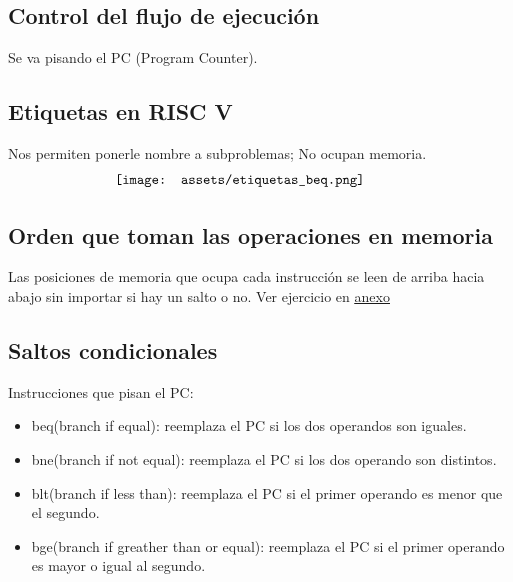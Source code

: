 \documentclass[10pt,a4paper]{article}
\begin{document}
\subsection*{Control del flujo de ejecución}
Se va pisando el PC (Program Counter). 

\subsection*{Etiquetas en RISC V}
Nos permiten ponerle nombre a subproblemas; No ocupan memoria.
\[\begin{minipage}[b]{0.6\textwidth}
    \texttt{[image: assets/etiquetas\_beq.png]}
    \label{fig:etiquetas_beq}
\end{minipage}\] 

\subsection*{Orden que toman las operaciones en memoria}
Las posiciones de memoria que ocupa cada instrucción se leen de arriba hacia abajo sin importar si hay un salto o no.
Ver ejercicio en \hyperref[subsec:TPRVC]{\underline{anexo}} 
\subsection*{Saltos condicionales}
Instrucciones que pisan el PC: 
\begin{itemize}
    \item beq(branch if equal): reemplaza el PC si los dos operandos son iguales.
    \item bne(branch if not equal): reemplaza el PC si los dos operando son distintos.
    \item blt(branch if less than): reemplaza el PC si el primer operando es menor que el segundo.
    \item bge(branch if greather than or equal): reemplaza el PC si el primer operando es mayor o igual al segundo.
\end{itemize}
\end{document}

